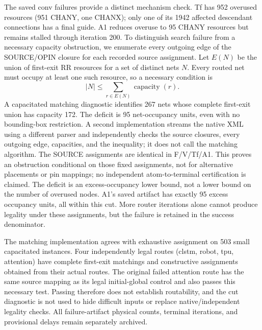 \documentclass[conference,10pt]{IEEEtran}
\begin{document}


The saved conv failures provide a distinct mechanism check. Tf has 952 overused resources (951 CHANY, one CHANX); only one of its 1942 affected descendant connections has a final guide. A1 reduces overuse to 95 CHANY resources but remains stalled through iteration 200. To distinguish search failure from a necessary capacity obstruction, we enumerate every outgoing edge of the SOURCE/OPIN closure for each recorded source assignment. Let $E(N)$ be the union of first-exit RR resources for a set of distinct nets $N$. Every routed net must occupy at least one such resource, so a necessary condition is
\[
 |N| \leq \sum_{r\in E(N)} \operatorname{capacity}(r).
\]
A capacitated matching diagnostic identifies 267 nets whose complete first-exit union has capacity 172. The deficit is 95 net-occupancy units, even with no bounding-box restriction. A second implementation streams the native XML using a different parser and independently checks the source closures, every outgoing edge, capacities, and the inequality; it does not call the matching algorithm. The SOURCE assignments are identical in F/V/Tf/A1. This proves an obstruction conditional on those fixed assignments, not for alternative placements or pin mappings; no independent atom-to-terminal certification is claimed. The deficit is an excess-occupancy lower bound, not a lower bound on the number of overused nodes. A1's saved artifact has exactly 95 excess occupancy units, all within this cut. More router iterations alone cannot produce legality under these assignments, but the failure is retained in the success denominator.

The matching implementation agrees with exhaustive assignment on 503 small capacitated instances. Four independently legal routes (clstm, robot, tpu, attention) have complete first-exit matchings and constructive assignments obtained from their actual routes. The original failed attention route has the same source mapping as its legal initial-global control and also passes this necessary test. Passing therefore does not establish routability, and the cut diagnostic is not used to hide difficult inputs or replace native/independent legality checks. All failure-artifact physical counts, terminal iterations, and provisional delays remain separately archived.
\end{document}
